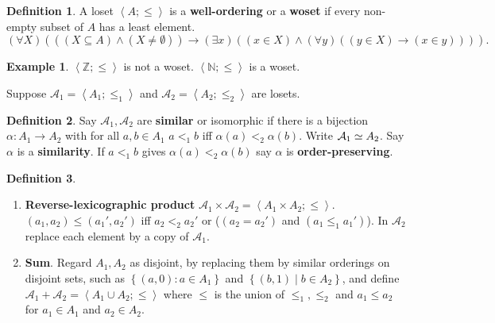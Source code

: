 \documentclass{article}
\newcommand{\N}{\mathbb{N}}
\newcommand{\Z}{\mathbb{Z}}
\newcommand{\A}{\mathcal{A}}
\newcommand{\rb}[1]{\left( #1 \right)}
\newcommand{\cb}[1]{\left\{ #1 \right\}}
\newcommand{\ab}[1]{\left\langle #1 \right\rangle}
\newcommand{\andb}[2]{\rb{#1 \land #2}}
\newcommand{\impb}[2]{\rb{#1 \rightarrow #2}}
\newcommand{\fab}[1]{\rb{\forall #1}}
\newcommand{\teb}[1]{\rb{\exists #1}}
\newcommand{\inb}[2]{\rb{#1 \in #2}}
\newcommand{\subb}[2]{\rb{#1 \subseteq #2}}
\theoremstyle{definition}\newtheorem{definition}{Definition}[subsection]
\theoremstyle{definition}\newtheorem{remark}[definition]{Remark}
\theoremstyle{definition}\newtheorem*{example}{Example}
\theoremstyle{definition}\newtheorem*{note}{Note}
\begin{document}
\begin{definition}
A loset $ \ab{A; \le} $ is a \textbf{well-ordering} or a \textbf{woset} if every non-empty subset of $ A $ has a least element.
$$ \fab{X}\impb{\andb{\subb{X}{A}}{\rb{X \ne \emptyset}}}{\teb{x}\andb{\inb{x}{X}}{\fab{y}\impb{\inb{y}{X}}{\inb{x}{y}}}}. $$
\end{definition}

\begin{example}
$ \ab{\Z; \le} $ is not a woset. $ \ab{\N; \le} $ is a woset.
\end{example}


Suppose $ \A_1 = \ab{A_1; \le_1} $ and $ \A_2 = \ab{A_2; \le_2} $ are losets.

\begin{definition}
Say $ \A_1, \A_2 $ are \textbf{similar} or isomorphic if there is a bijection $ \alpha : A_1 \to A_2 $ with for all $ a, b \in A_1 $ $ a <_1 b $ iff $ \alpha\rb{a} <_2 \alpha\rb{b} $. Write $ \A_1 \simeq \mathcal \A_2 $. Say $ \alpha $ is a \textbf{similarity}. If $ a <_1 b $ gives $ \alpha\rb{a} <_2 \alpha\rb{b} $ say $ \alpha $ is \textbf{order-preserving}.
\end{definition}

\begin{definition}
\hfill
\begin{enumerate}
\item \textbf{Reverse-lexicographic product} $ \A_1 \times \A_2 = \ab{A_1 \times A_2; \le} $. $ \rb{a_1, a_2} \le \rb{a_1', a_2'} $ iff $ a_2 <_2 a_2' $ or ($ \rb{a_2 = a_2'} $ and $ \rb{a_1 \le_1 a_1'} $). In $ \A_2 $ replace each element by a copy of $ \A_1 $.
\item \textbf{Sum}. Regard $ A_1, A_2 $ as disjoint, by replacing them by similar orderings on disjoint sets, such as $ \cb{\rb{a, 0} : a \in A_1} $ and $ \cb{\rb{b, 1} \mid b \in A_2} $, and define $ \A_1 + \A_2 = \ab{A_1 \cup A_2; \le} $ where $ \le $ is the union of $ \le_1, \le_2 $ and $ a_1 \le a_2 $ for $ a_1 \in A_1 $ and $ a_2 \in A_2 $.
\end{enumerate}
\end{definition}
\end{document}
